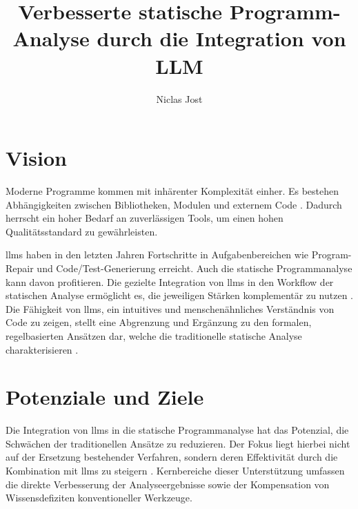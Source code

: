 \documentclass[%
    paper=A4,               %
    ngerman,
    parskip=half,           %
    11pt,                   %
    headings=normal,        %
    bibliography=totoc,     %
    listof=totoc,           %
    chapterprefix=false,    %
    appendixprefix=false,    %
    draft=false,            %
]{scrartcl}%
\title{Verbesserte statische Programm-Analyse durch die Integration von LLM}
\author{Niclas Jost}
\date{}
\begin{document}
\maketitle
\thispagestyle{scrheadings}
\section{Vision} 


Moderne Programme kommen mit inhärenter Komplexität einher. Es bestehen Abhängigkeiten zwischen Bibliotheken, Modulen und externem Code \cite{khareUnderstandingEffectivenessLarge2024}. Dadurch herrscht ein hoher Bedarf an zuverlässigen Tools, um einen hohen Qualitätsstandard zu gewährleisten.

\acp{llm} haben in den letzten Jahren Fortschritte in Aufgabenbereichen wie Program-Repair \cite{xiaAutomatedProgramRepair2023} und Code/Test-Generierung \cite{lemieuxCodaMosaEscapingCoverage2023} erreicht. Auch die statische Programmanalyse kann davon profitieren. Die gezielte Integration von \acp{llm} in den Workflow der statischen Analyse ermöglicht es, die jeweiligen Stärken komplementär zu nutzen \cite{liEnhancingStaticAnalysis2024}\cite{wagnerEffectiveComplementarySecurity2025}.
Die Fähigkeit von \acp{llm}, ein intuitives und menschenähnliches Verständnis von Code zu zeigen, stellt eine Abgrenzung und Ergänzung zu den formalen, regelbasierten Ansätzen dar, welche die traditionelle statische Analyse charakterisieren \cite{liEnhancingStaticAnalysis2024}.



\selectlanguage{\ngerman}


\section{Potenziale und Ziele}\label{sec:potent}

Die Integration von \acp{llm} in die statische Programmanalyse hat das Potenzial, die Schwächen der traditionellen Ansätze zu reduzieren. Der Fokus liegt hierbei nicht auf der Ersetzung bestehender Verfahren, sondern deren Effektivität durch die Kombination mit \acp{llm} zu steigern \cite{khareUnderstandingEffectivenessLarge2024}. Kernbereiche dieser Unterstützung umfassen die direkte Verbesserung der Analyseergebnisse sowie der Kompensation von Wissensdefiziten konventioneller Werkzeuge.
\end{document}
